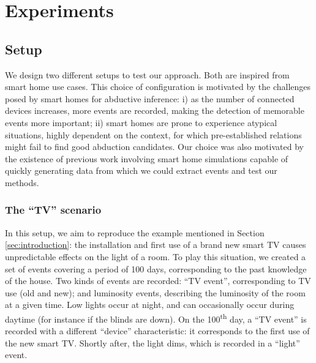 \documentclass[entropy,article,submit,moreauthors,pdftex]{Definitions/mdpi}
\begin{document}
\section{Experiments}
\label{sec:results}
\subsection{Setup}
\label{sec:setup}

We design two different setups to test our approach. Both are inspired from smart home use cases.  This choice of
configuration is motivated by the challenges posed by smart homes for abductive
inference: i) as the number of connected devices increases, more events are
recorded, making the detection of memorable events more important; ii) smart
homes are prone to experience atypical situations, highly dependent on the context,
for which pre-established relations might fail to find good abduction
candidates. Our choice was also motivated by
the existence of previous work\cite{lalanda_self-aware_2017} involving smart home simulations capable of quickly generating data from which we could extract events and test our methods.


\subsubsection{The ``TV'' scenario}
In this setup, we aim to reproduce the example mentioned in Section \ref{sec:introduction}: the installation and first use of a brand new smart TV causes unpredictable effects on the light of a room.
To play this situation, we created a set of events covering a period of 100 days, corresponding to the past knowledge of the house. Two kinds of events are recorded: ``TV event'', corresponding to TV use (old and new); and luminosity events, describing the luminosity of the room at a given time. Low lights occur at night, and can occasionally occur during daytime (for instance if the blinds are down). On the 100\textsuperscript{th} day, a ``TV event'' is recorded with a different ``device'' characteristic: it corresponds to the first use of the new smart TV. Shortly after, the light dims, which is recorded in a ``light'' event.
\end{document}
